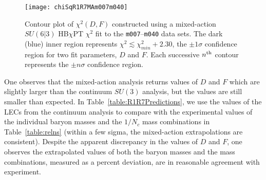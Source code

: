 \documentclass[twocolumn,nofootinbib,prd,aps,superscriptaddress,tightenlines]{revtex4}
\begin{document}
\begin{figure}
\texttt{[image: chiSqR1R7MAm007m040]}
\caption{Contour plot of $\chi^2(D,F)$ constructed using a mixed-action $SU(6|3)$ HB$\chi$PT $\chi^2$ fit to the \texttt{m007}--\texttt{m040} data sets.  The dark (blue) inner region represents $\chi^2 \lesssim \chi^2_{min} + 2.30$, the $\pm1\sigma$ confidence region for two fit parameters, $D$ and $F$.  Each successive $n^{\rm th}$ contour represents the $\pm n \sigma$ confidence region.  \label{fig:chisqMA007040}}
\end{figure}

One observes that the mixed-action analysis returns values of $D$ and $F$ which are slightly larger than the continuum $SU(3)$ analysis, but the values are still smaller than expected.  In Table~\ref{table:R1R7Predictions}, we use the values of the LECs from the continuum analysis to compare with the experimental values of the individual baryon masses and the $1/N_c$ mass combinations in Table~\ref{table:relns} (within a few sigma, the mixed-action extrapolations are consistent).  Despite the apparent discrepancy in the values of $D$ and $F$, one observes the extrapolated values of both the baryon masses and the mass combinations, measured as a percent deviation, are in reasonable agreement with experiment.
\end{document}
